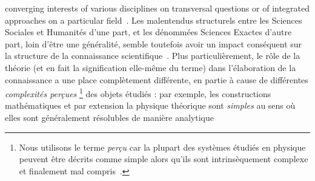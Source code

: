 {converging interests of various disciplines on transversal questions or of integrated approaches on a particular field~\cite{2009arXiv0907.2221B}.
}{
Les malentendus structurels entre les Sciences Sociales et Humanités d'une part, et les dénommées Sciences Exactes d'autre part, 
loin d'être une généralité, 
semble toutefois avoir un impact conséquent sur la structure de la connaissance scientifique~\cite{2015arXiv151103981H}. 
Plus particulièrement, le rôle de la théorie (et en fait la signification elle-même du terme) dans l'élaboration de la connaissance a une place complètement différente, en partie à cause de différentes \emph{complexités perçues}
\footnote{Nous utilisons le terme \emph{perçu} car la plupart des systèmes étudiés en physique peuvent être décrits comme simple alors qu'ils sont intrinsèquement complexe et finalement mal compris~\cite{laughlin2006different}.} des objets étudiés : par exemple, les constructions mathématiques et par extension la physique théorique sont \emph{simples} au sens où elles sont généralement résolubles de manière analytique 
}
